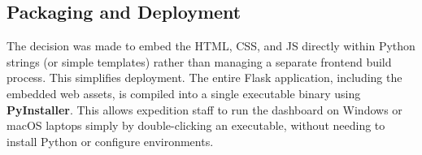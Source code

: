\subsection{Packaging and Deployment}
The decision was made to embed the HTML, CSS, and JS directly within Python strings (or simple templates) rather than managing a separate frontend build process. This simplifies deployment. The entire Flask application, including the embedded web assets, is compiled into a single executable binary using \textbf{PyInstaller}. This allows expedition staff to run the dashboard on Windows or macOS laptops simply by double-clicking an executable, without needing to install Python or configure environments.
